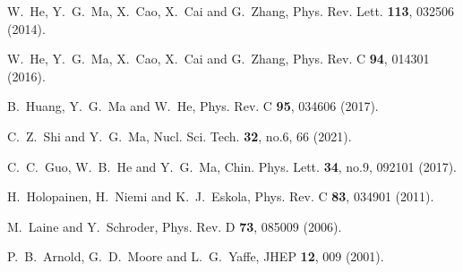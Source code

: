 \documentclass[aps,prc,twocolumn,floatfix,12pts,superscriptaddress]{revtex4}
\begin{document}
{{\begin{thebibliography}{99}
W.~He, Y.~G.~Ma, X.~Cao, X.~Cai and G.~Zhang,
Phys. Rev. Lett. \textbf{113}, 032506 (2014).


W.~He, Y.~G.~Ma, X.~Cao, X.~Cai and G.~Zhang,
Phys. Rev. C \textbf{94}, 014301 (2016).

B.~Huang, Y.~G.~Ma and W.~He,
Phys. Rev. C \textbf{95}, 034606 (2017).

C.~Z.~Shi and Y.~G.~Ma,
Nucl. Sci. Tech. \textbf{32}, no.6, 66 (2021).

C.~C.~Guo, W.~B.~He and Y.~G.~Ma,
Chin. Phys. Lett. \textbf{34}, no.9, 092101 (2017).

H.~Holopainen, H.~Niemi and K.~J.~Eskola,
Phys. Rev. C \textbf{83}, 034901 (2011).

M.~Laine and Y.~Schroder,
Phys. Rev. D \textbf{73}, 085009 (2006).
	
P.~B.~Arnold, G.~D.~Moore and L.~G.~Yaffe,
JHEP \textbf{12}, 009 (2001).


\end{thebibliography}}}
\end{document}
